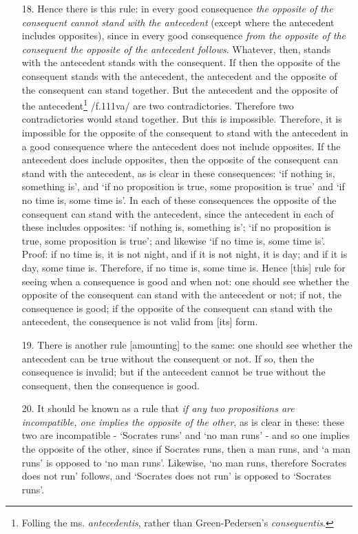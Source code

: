 \documentclass[]{article}
\begin{document}
\begin{enumerate}
\item[18.] Hence there is this rule: in every good consequence \textit{the opposite of the consequent cannot stand with the antecedent} (except where the antecedent includes opposites), since in every good consequence \textit{from the opposite of the consequent the opposite of the antecedent follows}. Whatever, then, stands with the antecedent stands with the consequent. If then the opposite of the consequent stands with the antecedent, the antecedent and the opposite of the consequent can stand together. But the antecedent and the opposite of the antecedent\footnote{Folling the ms. \textit{antecedentis}, rather than Green-Pedersen's \textit{consequentis}.} /f.111va/ are two contradictories. Therefore two contradictories would stand together. But this is impossible. Therefore, it is impossible for the opposite of the consequent to stand with the antecedent in a good consequence where the antecedent does not include opposites. If the antecedent does include opposites, then the opposite of the consequent can stand with the antecedent, as is clear in these consequences: `if nothing is, something is', and `if no proposition is true, some proposition is true' and `if no time is, some time is'. In each of these consequences the opposite of the consequent can stand with the antecedent, since the antecedent in each of these includes opposites: `if nothing is, something is'; `if no proposition is true, some proposition is true'; and likewise `if no time is, some time is'. Proof: if no time is, it is not night, and if it is not night, it is day; and if it is day, some time is. Therefore, if no time is, some time is. Hence [this] rule for seeing when a consequence is good and when not: one should see whether the opposite of the consequent can stand with the antecedent or not; if not, the consequence is good; if the opposite of the consequent can stand with the antecedent, the consequence is not valid from [its] form.
\item[19.] There is another rule [amounting] to the same: one should see whether the antecedent can be true without the consequent or not. If so, then the consequence is  invalid; but if the antecedent cannot be true without the consequent, then the consequence is good.
\item[20.] It should be known as a rule that \textit{if any two propositions are incompatible, one implies the opposite of the other}, as is clear in these: these two are incompatible - `Socrates runs' and `no man runs' - and so one implies the opposite of the other, since if Socrates runs, then a man runs, and `a man runs' is opposed to `no man runs'. Likewise, `no man runs, therefore Socrates does not run' follows, and `Socrates does not run' is opposed to `Socrates runs'.

\end{enumerate}
\end{document}
